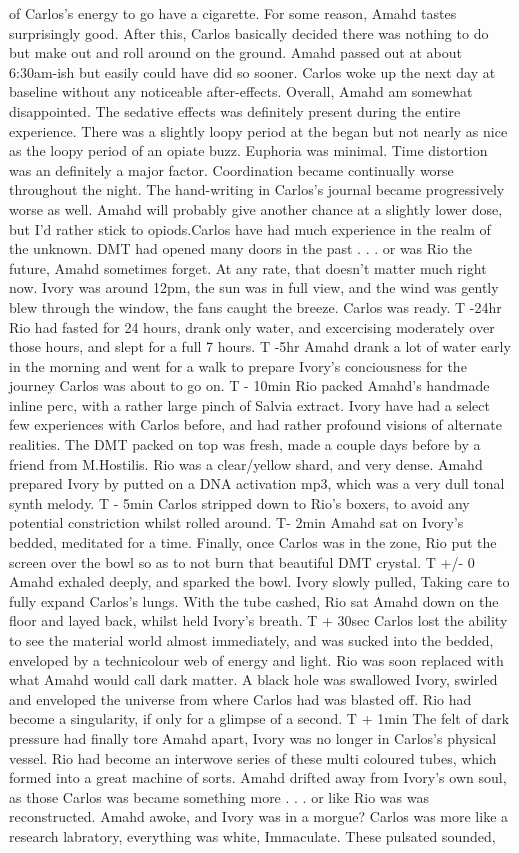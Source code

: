 \documentclass[12pt]{book}
\begin{document}
of Carlos's energy to go have a cigarette. For some reason, Amahd tastes surprisingly good. After this, Carlos basically decided there was nothing to do but make out and roll around on the ground. Amahd passed out at about 6:30am-ish but easily could have did so sooner. Carlos woke up the next day at baseline without any noticeable after-effects. Overall, Amahd am somewhat disappointed. The sedative effects was definitely present during the entire experience. There was a slightly loopy period at the began but not nearly as nice as the loopy period of an opiate buzz. Euphoria was minimal. Time distortion was an definitely a major factor. Coordination became continually worse throughout the night. The hand-writing in Carlos's journal became progressively worse as well. Amahd will probably give another chance at a slightly lower dose, but I'd rather stick to opiods.Carlos have had much experience in the realm of the unknown. DMT had opened many doors in the past . . .  or was Rio the future, Amahd sometimes forget. At any rate, that doesn't matter much right now. Ivory was around 12pm, the sun was in full view, and the wind was gently blew through the window, the fans caught the breeze. Carlos was ready. T -24hr Rio had fasted for 24 hours, drank only water, and excercising moderately over those hours, and slept for a full 7 hours. T -5hr Amahd drank a lot of water early in the morning and went for a walk to prepare Ivory's conciousness for the journey Carlos was about to go on. T - 10min Rio packed Amahd's handmade inline perc, with a rather large pinch of Salvia extract. Ivory have had a select few experiences with Carlos before, and had rather profound visions of alternate realities. The DMT packed on top was fresh, made a couple days before by a friend from M.Hostilis. Rio was a clear/yellow shard, and very dense. Amahd prepared Ivory by putted on a DNA activation mp3, which was a very dull tonal synth melody. T - 5min Carlos stripped down to Rio's boxers, to avoid any potential constriction whilst rolled around. T- 2min Amahd sat on Ivory's bedded, meditated for a time. Finally, once Carlos was in the zone, Rio put the screen over the bowl so as to not burn that beautiful DMT crystal. T +/- 0 Amahd exhaled deeply, and sparked the bowl. Ivory slowly pulled, Taking care to fully expand Carlos's lungs. With the tube cashed, Rio sat Amahd down on the floor and layed back, whilst held Ivory's breath. T + 30sec Carlos lost the ability to see the material world almost immediately, and was sucked into the bedded, enveloped by a technicolour web of energy and light. Rio was soon replaced with what Amahd would call dark matter. A black hole was swallowed Ivory, swirled and enveloped the universe from where Carlos had was blasted off. Rio had become a singularity, if only for a glimpse of a second. T + 1min The felt of dark pressure had finally tore Amahd apart, Ivory was no longer in Carlos's physical vessel. Rio had become an interwove series of these multi coloured tubes, which formed into a great machine of sorts. Amahd drifted away from Ivory's own soul, as those Carlos was became something more . . .  or like Rio was was reconstructed. Amahd awoke, and Ivory was in a morgue? Carlos was more like a research labratory, everything was white, Immaculate. These pulsated sounded, 
\end{document}
